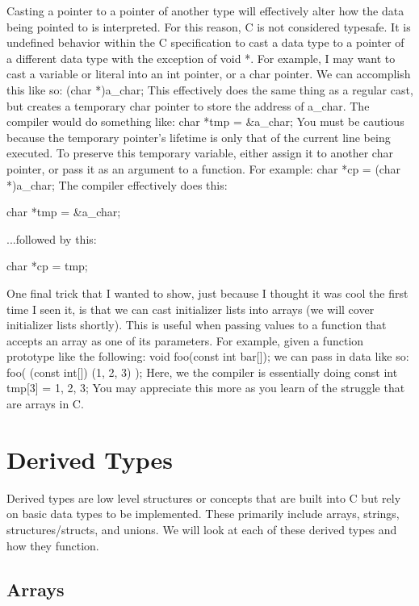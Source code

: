 \documentclass{article}
\begin{document}
Casting a pointer to a pointer of another type will effectively alter how the data being pointed to is
interpreted. For this reason, C is not considered typesafe. It is undefined behavior within the C
specification to cast a data type to a pointer of a different data type with the exception of void *. For
example, I may want to cast a variable or literal into an int pointer, or a char pointer. We can accomplish
this like so: (char *)a_char; This effectively does the same thing as a regular cast, but creates a temporary
char pointer to store the address of a_char. The compiler would do something like: char *tmp = &a_char; You
must be cautious because the temporary pointer’s lifetime is only that of the current line being executed. To
preserve this temporary variable, either assign it to another char pointer, or pass it as an argument to a
function. For example: char *cp = (char *)a_char; The compiler effectively does this:

\begin{cblk}
char *tmp = &a_char;
\end{cblk}

...followed by this:

\begin{cblk}
char *cp = tmp;
\end{cblk}

One final trick that I wanted to show, just because I thought it was cool the first time I seen it, is that
we can cast initializer lists into arrays (we will cover initializer lists shortly). This is useful when
passing values to a function that accepts an array as one of its parameters. For example, given a function
prototype like the following: void foo(const int bar[]); we can pass in data like so: foo( (const int[])
({1, 2, 3}) ); Here, we the compiler is essentially doing const int tmp[3] = {1, 2, 3}; You may appreciate
this more as you learn of the struggle that are arrays in C.

\section{Derived Types}

Derived types are low level structures or concepts that are built into C but rely on basic data types to be
implemented. These primarily include arrays, strings, structures/structs, and unions. We will look at each of
these derived types and how they function.

\subsection{Arrays}
\end{document}
